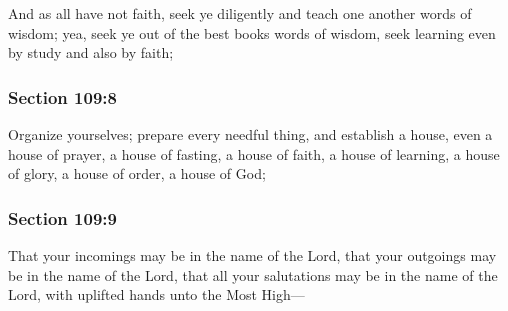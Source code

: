 		And as all have not faith, seek ye diligently and teach one another words of wisdom; yea, seek ye out of the best books words of wisdom, seek learning even by study and also by faith;


	\subsubsection{Section 109:8} %
		\label{DC109-8}

		Organize yourselves; prepare every needful thing, and establish a house, even a house of prayer, a house of fasting, a house of faith, a house of learning, a house of glory, a house of order, a house of God;


	\subsubsection{Section 109:9} %
		\label{DC109-9}

		That your incomings may be in the name of the Lord, that your outgoings may be in the name of the Lord, that all your salutations may be in the name of the Lord, with uplifted hands unto the Most High---


